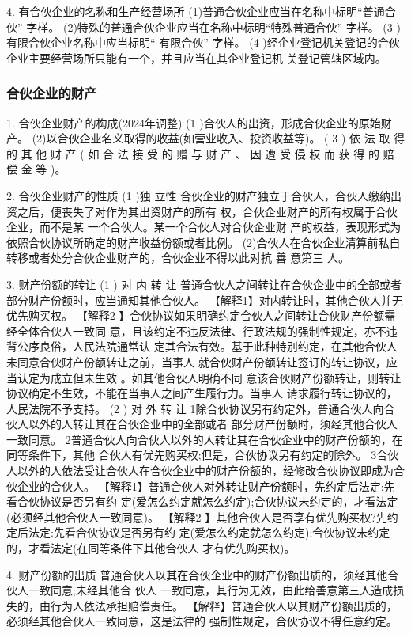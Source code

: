 \documentclass[UTF8,12pt]{ctexart}
\numberwithin{equation}{section} %
\numberwithin{figure}{section}
\numberwithin{table}{section}
\begin{document}
	4. 有合伙企业的名称和生产经营场所
	(1)普通合伙企业应当在名称中标明“普通合伙” 字样。 (2)特殊的普通合伙企业应当在名称中标明“特殊普通合伙” 字样。
	(3 )有限合伙企业名称中应当标明“ 有限合伙” 字样。
	(4 )经企业登记机关登记的合伙企业主要经营场所只能有一个，并且应当在其企业登记机 关登记管辖区域内。
	
	\subsubsection{合伙企业的财产}
	1. 合伙企业财产的构成(2024年调整)
	(1 )合伙人的出资，形成合伙企业的原始财产。 (2)以合伙企业名义取得的收益(如营业收入、投资收益等)。
	( 3 ) 依 法 取 得 的 其 他 财 产 ( 如 合 法 接 受 的 赠 与 财 产 、 因 遭 受 侵 权 而 获 得 的 赔 偿 金 等 )。
	
	2. 合伙企业财产的性质
	(1 )独 立性 合伙企业的财产独立于合伙人，合伙人缴纳出资之后，便丧失了对作为其出资财产的所有 权，合伙企业财产的所有权属于合伙企业，而不是某 一个合伙人。某一个合伙人对合伙企业财 产的权益，表现形式为依照合伙协议所确定的财产收益份额或者比例。 (2)合伙人在合伙企业清算前私自转移或者处分合伙企业财产的，合伙企业不得以此对抗 善 意第三 人。
	
	3. 财产份额的转让
	(1 ) 对 内 转 让 普通合伙人之间转让在合伙企业中的全部或者部分财产份额时，应当通知其他合伙人。 【解释1】对内转让时，其他合伙人并无优先购买权。
	【解释2 】合伙协议如果明确约定合伙人之间转让合伙财产份额需经全体合伙人一致同 意，且该约定不违反法律、行政法规的强制性规定，亦不违背公序良俗，人民法院通常认 定其合法有效。基于此种特别约定，在其他合伙人未同意合伙财产份额转让之前，当事人 就合伙财产份额转让签订的转让协议，应当认定为成立但未生效 。如其他合伙人明确不同 意该合伙财产份额转让，则转让协议确定不生效，不能在当事人之间产生履行力。当事人 请求履行转让协议的，人民法院不予支持。
	(2 ) 对 外 转 让 1除合伙协议另有约定外，普通合伙人向合伙人以外的人转让其在合伙企业中的全部或者 部分财产份额时，须经其他合伙人一致同意。 2普通合伙人向合伙人以外的人转让其在合伙企业中的财产份额的，在同等条件下，其他 合伙人有优先购买权;但是，合伙协议另有约定的除外。 3合伙人以外的人依法受让合伙人在合伙企业中的财产份额的，经修改合伙协议即成为合 伙企业的合伙人。
	【解释1】普通合伙人对外转让财产份额时，先约定后法定:先看合伙协议是否另有约 定(爱怎么约定就怎么约定);合伙协议未约定的，才看法定(必须经其他合伙人一致同意)。
	【解释2 】其他合伙人是否享有优先购买权?先约定后法定:先看合伙协议是否另有约 定(爱怎么约定就怎么约定);合伙协议未约定的，才看法定(在同等条件下其他合伙人 才有优先购买权)。
	
	4. 财产份额的出质 普通合伙人以其在合伙企业中的财产份额出质的，须经其他合伙人一致同意;未经其他合 伙人 一致同意，其行为无效，由此给善意第三人造成损失的，由行为人依法承担赔偿责任。
	【解释】普通合伙人以其财产份额出质的，必须经其他合伙人一致同意，这是法律的 强制性规定，合伙协议不得任意约定。
	
\end{document}
